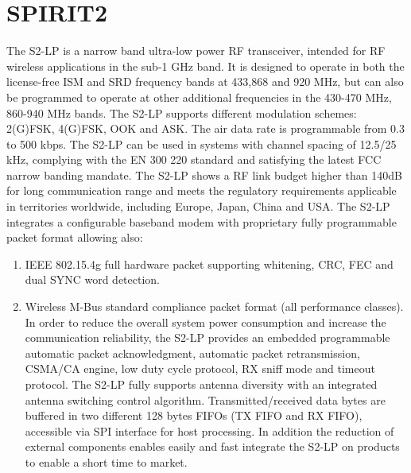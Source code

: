 \section{SPIRIT2}
The S2-LP is a narrow band ultra-low power RF transceiver, intended for RF wireless applications in the sub-1 GHz band. It is designed to operate in both the license-free ISM and SRD frequency bands at 433,868 and 920 MHz, but can also be programmed to operate at other additional frequencies in the 430-470 MHz, 860-940 MHz bands. The S2-LP supports different modulation schemes: 2(G)FSK, 4(G)FSK, OOK and ASK. The air data rate is programmable from 0.3 to 500 kbps. The S2-LP can be used in systems with channel spacing of 12.5/25 kHz, complying with the EN 300 220 standard and satisfying the latest FCC narrow banding mandate.
The S2-LP shows a RF link budget higher than 140dB for long communication range and meets the regulatory requirements applicable in territories worldwide, including Europe, Japan, China and USA. The S2-LP integrates a configurable baseband modem with proprietary fully programmable packet format allowing also:
\begin{enumerate}
	\item{IEEE 802.15.4g full hardware packet supporting whitening, CRC, FEC and dual SYNC
	word detection.}
	\item{Wireless M-Bus standard compliance packet format (all performance classes).
	In order to reduce the overall system power consumption and increase the communication reliability, the S2-LP provides an embedded programmable automatic packet acknowledgment, automatic packet retransmission, CSMA/CA engine, low duty cycle protocol, RX sniff mode and timeout protocol. The S2-LP fully supports antenna diversity with an integrated antenna switching control algorithm. Transmitted/received data bytes are buffered in two different 128 bytes FIFOs (TX FIFO and RX FIFO), accessible via SPI interface for host processing. In addition the reduction of external components enables easily and fast integrate the S2-LP on products to enable a short time to market.}
\end{enumerate}
